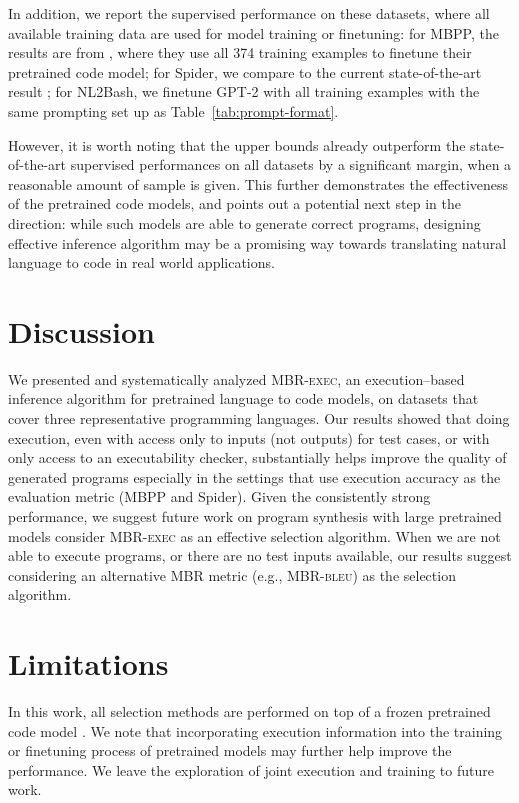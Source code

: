 \documentclass[11pt]{article}
\newcommand{\mbrexec}{\textsc{MBR-exec}\xspace}
\newcommand{\mbrbleu}{\textsc{MBR-bleu}\xspace}
\begin{document}
In addition, we report the supervised performance on these datasets, where all available training data are used for model training or finetuning: for MBPP, the results are from \citet{austin2021program}, where they use all 374 training examples to finetune their pretrained code model; for Spider, we compare to the current state-of-the-art result  \citep{scholak-etal-2021-picard}; for NL2Bash, we finetune GPT-2 \citep{radford2019language} with all training examples with the same prompting set up as Table~\ref{tab:prompt-format}.

However, it is worth noting that the upper bounds already outperform the state-of-the-art supervised performances on all datasets by a significant margin, when a reasonable amount of sample is given. This further demonstrates the effectiveness of the pretrained code models, and points out a potential next step in the direction: while such models are able to generate correct programs, designing effective inference algorithm may be a promising way towards translating natural language to code in real world applications.  \section{Discussion}
\label{sec:discussion}
We presented and systematically analyzed \mbrexec, an execution--based inference algorithm for pretrained language to code models, on datasets that cover three representative programming languages. Our results showed that doing execution, even with access only to inputs (not outputs) for test cases, or with only access to an executability checker, substantially helps improve the quality of generated programs especially in the settings that use execution accuracy as the evaluation metric (MBPP and Spider). Given the consistently strong performance, we suggest future work on program synthesis with large pretrained models consider \mbrexec as an effective selection algorithm. When we are not able to execute programs, or there are no test inputs available, our results suggest considering an alternative MBR metric (e.g., \mbrbleu) as the selection algorithm.


\section*{Limitations}
In this work, all selection methods are performed on top of a frozen pretrained code model \citep[Codex;][]{chen2021evaluating}. We note that incorporating execution information into the training or finetuning process of pretrained models may further help improve the performance. We leave the exploration of joint execution and training to future work. 
\end{document}

